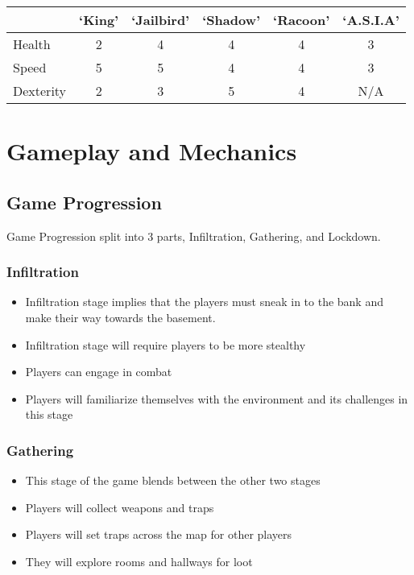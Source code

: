\documentclass[10pt]{report}
\begin{document}
\begin{center}
    \begin{tabular}{|l|c|c|c|c|c|}
        \hline
                    & `King'        & `Jailbird'    & `Shadow'      & `Racoon'      & `A.S.I.A' \\ \hline
        Health      &  2            & 4             & 4             & 4             & 3         \\ \hline
        Speed       &  5            & 5             & 4             & 4             & 3         \\ \hline
        Dexterity   &  2            & 3             & 5             & 4             & N/A       \\ \hline
    \end{tabular}
\end{center}


\chapter{Gameplay and Mechanics}

\section{Game Progression}

Game Progression split into 3 parts, Infiltration, Gathering, and Lockdown.

\subsection{Infiltration}

\begin{itemize}
    \item Infiltration stage implies that the players must sneak in to the bank and make their way towards the basement.
    \item Infiltration stage will require players to be more stealthy
    \item Players can engage in combat
    \item Players will familiarize themselves with the environment and its challenges in this stage
\end{itemize}
\subsection{Gathering}

\begin{itemize}
    \item This stage of the game blends between the other two stages
    \item Players will collect weapons and traps
    \item Players will set traps across the map for other players
    \item They will explore rooms and hallways for loot 
\end{itemize}
\end{document}
